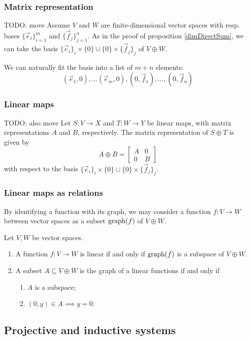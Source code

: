 \subsubsection{Matrix representation}
TODO: move
Assume $V$ and $W$ are finite-dimensional vector spaces with resp. bases $\{\vec{e}_i\}_{i=1}^m$ and $\{\vec{f}_j\}_{j=1}^n$.
As in the proof of proposition \ref{dimDirectSum}, we can take the basis $\{\vec{e}_i\}_i\times\{0\} \cup \{0\}\times\{\vec{f}_j\}_j$ of $V\oplus W$.

We can naturally fit the basis into a list of $m+n$ elements:
\[ (\vec{e}_1,0),\ldots (\vec{e}_m, 0), (0, \vec{f}_1), \ldots, (0,\vec{f}_n)  \]
\subsubsection{Linear maps}
TODO: also move
Let $S: V\to X$ and $T:W\to Y$ be linear maps, with matrix representations $A$ and $B$, respectively. The matrix representation of $S\oplus T$ is given by
\[ A\oplus B = \begin{bmatrix}
A & 0 \\
0 & B
\end{bmatrix} \]
with respect to the basis $\{\vec{e}_i\}_i\times\{0\} \cup \{0\}\times\{\vec{f}_j\}_j$.

\subsubsection{Linear maps as relations}
By identifying a function with its graph, we may consider a function $f: V\to W$ between vector spaces as a subset $\operatorname{graph}(f)$ of $V\oplus W$.

\begin{proposition}
Let $V,W$ be vector spaces.
\begin{enumerate}
\item A function $f: V\to W$ is linear \textup{if and only if} $\operatorname{graph}(f)$ is a subspace of $V\oplus W$.
\item A subset $A\subseteq V\oplus W$ is the graph of a linear functions \textup{if and only if}
\begin{enumerate}
\item $A$ is a subspace;
\item $(0,y)\in A \implies y=0$.
\end{enumerate}
\end{enumerate}
\end{proposition}

\subsection{Projective and inductive systems}
